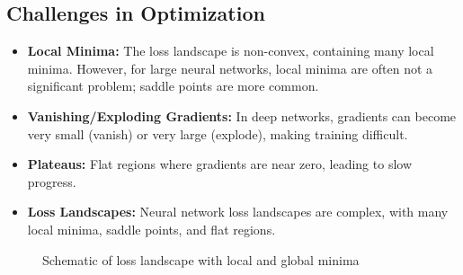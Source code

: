 \subsection{Challenges in Optimization}

\begin{itemize}
    \item \textbf{Local Minima:} The loss landscape is non-convex, containing many local minima. However, for large neural networks, local minima are often not a significant problem; saddle points are more common.
    
    \item \textbf{Vanishing/Exploding Gradients:} In deep networks, gradients can become very small (vanish) or very large (explode), making training difficult.
    
    \item \textbf{Plateaus:} Flat regions where gradients are near zero, leading to slow progress.
    
    \item \textbf{Loss Landscapes:} Neural network loss landscapes are complex, with many local minima, saddle points, and flat regions.
\end{itemize}

\begin{figure}[htbp]
    \centering
    \caption{Schematic of loss landscape with local and global minima}
    \label{fig:loss_landscape}
\end{figure}


